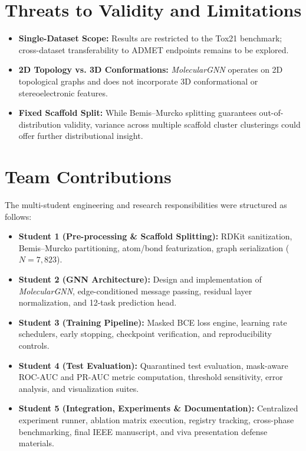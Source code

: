 \documentclass[conference]{IEEEtran}
\begin{document}
\section{Threats to Validity and Limitations}
\begin{itemize}
    \item \textbf{Single-Dataset Scope:} Results are restricted to the Tox21 benchmark; cross-dataset transferability to ADMET endpoints remains to be explored.
    \item \textbf{2D Topology vs. 3D Conformations:} \textit{MolecularGNN} operates on 2D topological graphs and does not incorporate 3D conformational or stereoelectronic features.
    \item \textbf{Fixed Scaffold Split:} While Bemis--Murcko splitting guarantees out-of-distribution validity, variance across multiple scaffold cluster clusterings could offer further distributional insight.
\end{itemize}

\section{Team Contributions}
The multi-student engineering and research responsibilities were structured as follows:
\begin{itemize}
    \item \textbf{Student 1 (Pre-processing \& Scaffold Splitting):} RDKit sanitization, Bemis--Murcko partitioning, atom/bond featurization, graph serialization ($N=7,823$).
    \item \textbf{Student 2 (GNN Architecture):} Design and implementation of \textit{MolecularGNN}, edge-conditioned message passing, residual layer normalization, and 12-task prediction head.
    \item \textbf{Student 3 (Training Pipeline):} Masked BCE loss engine, learning rate schedulers, early stopping, checkpoint verification, and reproducibility controls.
    \item \textbf{Student 4 (Test Evaluation):} Quarantined test evaluation, mask-aware ROC-AUC and PR-AUC metric computation, threshold sensitivity, error analysis, and visualization suites.
    \item \textbf{Student 5 (Integration, Experiments \& Documentation):} Centralized experiment runner, ablation matrix execution, registry tracking, cross-phase benchmarking, final IEEE manuscript, and viva presentation defense materials.
\end{itemize}
\end{document}
